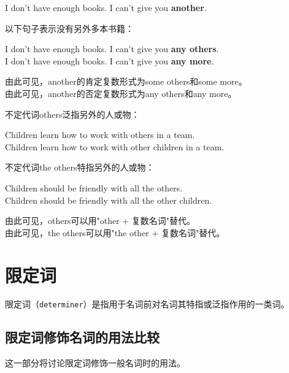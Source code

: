 \documentclass[UTF8]{ctexart}
\newcommand{\littf}[1]{{\hspace{3pt}\ttfamily #1}}
\begin{document}
    \begin{center}
        \large\ttfamily
        I don't have enough books. I can't give you \textbf{another}.\\[6mm]
    \end{center}
    以下句子表示没有另外多本书籍：
    \begin{center}
        \large\ttfamily
        I don't have enough books. I can't give you \textbf{any others}.\\[3mm]
        I don't have enough books. I can't give you \textbf{any more}.\\[6mm]
    \end{center}
    由此可见，\littf{another}的肯定复数形式为\littf{some others}和\littf{some more}。\\[3mm]
    由此可见，\littf{another}的否定复数形式为\littf{any others}和\littf{any more}。

\newpage

    不定代词\littf{others}泛指另外的人或物：
    \begin{center}
        \large\ttfamily
        Children learn how to work with others in a team.\\[3mm]
        Children learn how to work with other children in a team.\\[6mm]
    \end{center}
    不定代词\littf{the others}特指另外的人或物：
    \begin{center}
        \large\ttfamily
        Children should be friendly with all the others.\\[3mm]
        Children should be friendly with all the other children.\\[6mm]
    \end{center}
    由此可见，\littf{others}可以用\littf{"other + \hspace{0pt}复数名词"}替代。\\[3mm]
    由此可见，\littf{the others}可以用\littf{"the other + \hspace{0pt}复数名词"}替代。\\[3mm]

\newpage

\section{限定词}
    限定词（\texttt{determiner}）是指用于名词前对名词其特指或泛指作用的一类词。

\subsection{限定词修饰名词的用法比较}
    这一部分将讨论限定词修饰一般名词时的用法。
\end{document}
